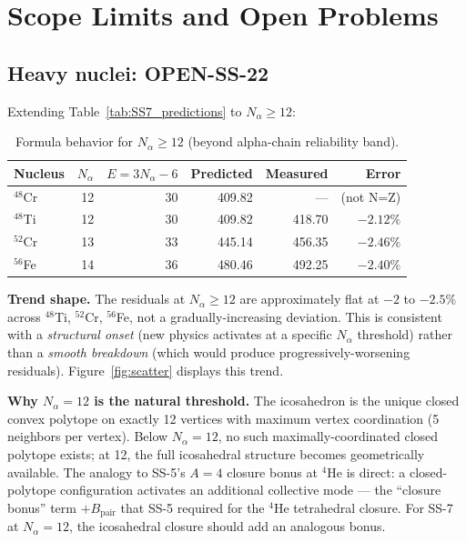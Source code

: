 \documentclass[11pt,letterpaper]{article}
\newcommand{\Bpair}{B_{\mathrm{pair}}}
\newcommand{\Nalpha}{N_{\alpha}}
\begin{document}
\section{Scope Limits and Open Problems}
\label{sec:limits}

\subsection{Heavy nuclei: OPEN-SS-22}
\label{sec:OPEN_SS_22}

Extending Table~\ref{tab:SS7_predictions} to $\Nalpha \geq 12$:

\begin{table}[H]
\centering
\caption{Formula behavior for $\Nalpha \geq 12$ (beyond alpha-chain reliability band).}
\begin{tabular}{@{}lrrrrr@{}}
\toprule
Nucleus & $\Nalpha$ & $E = 3\Nalpha - 6$ & Predicted & Measured & Error \\
\midrule
${}^{48}$Cr & 12 & 30 & 409.82 & --- & (not N=Z) \\
${}^{48}$Ti & 12 & 30 & 409.82 & 418.70 & $-2.12\%$ \\
${}^{52}$Cr & 13 & 33 & 445.14 & 456.35 & $-2.46\%$ \\
${}^{56}$Fe & 14 & 36 & 480.46 & 492.25 & $-2.40\%$ \\
\bottomrule
\end{tabular}
\end{table}

\textbf{Trend shape.} The residuals at $\Nalpha \geq 12$ are approximately flat at $-2$ to $-2.5\%$ across ${}^{48}$Ti, ${}^{52}$Cr, ${}^{56}$Fe, not a gradually-increasing deviation. This is consistent with a \emph{structural onset} (new physics activates at a specific $\Nalpha$ threshold) rather than a \emph{smooth breakdown} (which would produce progressively-worsening residuals). Figure~\ref{fig:scatter} displays this trend.

\textbf{Why $\Nalpha = 12$ is the natural threshold.} The icosahedron is the unique closed convex polytope on exactly 12 vertices with maximum vertex coordination (5 neighbors per vertex). Below $\Nalpha = 12$, no such maximally-coordinated closed polytope exists; at 12, the full icosahedral structure becomes geometrically available. The analogy to SS-5's $A = 4$ closure bonus at ${}^4$He is direct: a closed-polytope configuration activates an additional collective mode --- the ``closure bonus'' term $+\Bpair$ that SS-5 required for the ${}^4$He tetrahedral closure. For SS-7 at $\Nalpha = 12$, the icosahedral closure should add an analogous bonus.
\end{document}
